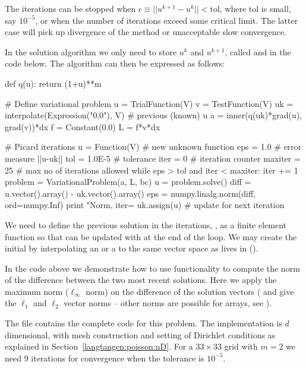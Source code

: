 The iterations can be stopped when $\epsilon\equiv ||u^{k+1}-u^k||
< \mathrm{tol}$, where $\mathrm{tol}$ is small, say $10^{-5}$, or
when the number of iterations exceed some critical limit. The latter
case will pick up divergence of the method or unacceptable slow
convergence.

In the solution algorithm we only need to store $u^k$ and $u^{k+1}$,
called  and  in the code below.
The algorithm can then be expressed as follows:
\begin{python}
def q(u):
    return (1+u)**m

# Define variational problem
u = TrialFunction(V)
v = TestFunction(V)
uk = interpolate(Expression("0.0"), V)  # previous (known) u
a = inner(q(uk)*grad(u), grad(v))*dx
f = Constant(0.0)
L = f*v*dx

# Picard iterations
u = Function(V)     # new unknown function
eps = 1.0           # error measure ||u-uk||
tol = 1.0E-5        # tolerance
iter = 0            # iteration counter
maxiter = 25        # max no of iterations allowed
while eps > tol and iter < maxiter:
    iter += 1
    problem = VariationalProblem(a, L, bc)
    u = problem.solve()
    diff = u.vector().array() - uk.vector().array()
    eps = numpy.linalg.norm(diff, ord=numpy.Inf)
    print "Norm, iter=%
    uk.assign(u)    # update for next iteration
\end{python}
We need to define the previous solution in the iterations,
, as a finite element function so
that  can be updated with
 at the end of the loop. We may
create the initial 
 by interpolating an
 or a
 to the same vector space as
 lives in
().

In the code above we demonstrate how to use
 functionality to compute the
norm of the difference between the two most recent solutions. Here we
apply the maximum norm ($\ell_\infty$ norm) on the difference of the
solution vectors ( and
 give the $\ell_1$ and $\ell_2$
vector norms -- other norms are possible for
 arrays, see
).

The file  contains
the complete code for this problem. The implementation is $d$
dimensional, with mesh construction and setting of Dirichlet
conditions as explained in Section~\ref{langtangen:poisson:nD}.  For a
$33\times 33$ grid with $m=2$ we need 9 iterations for convergence
when the tolerance is $10^{-5}$.

